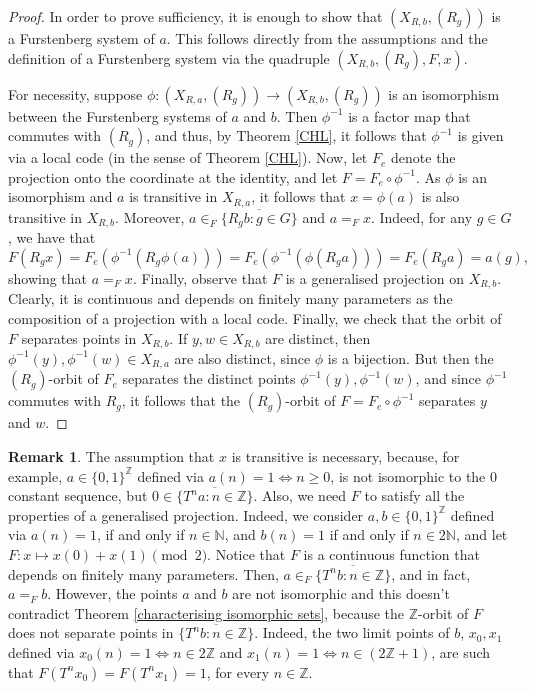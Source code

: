 \documentclass{amsart}
\numberwithin{equation}{section}
\theoremstyle{definition}
\newtheorem*{remark*}{Remark}
\theoremstyle{plain}
\newcommand{\N}{{\mathbb N}}
\newcommand{\Z}{{\mathbb Z}}
\begin{document}
\begin{proof}
In order to prove sufficiency, it is enough to show that 
$(X_{R,b},(R_g))$ is a Furstenberg system of $a$. This follows 
directly from the assumptions and the definition of a Furstenberg 
system via the quadruple $(X_{R,b},(R_g), F,x)$.

For necessity, suppose $\phi: (X_{R,a},(R_g)) \to (X_{R,b},(R_g))$ is 
an isomorphism between the Furstenberg systems of $a$ and $b$. Then $\phi^{-1}$ is 
a factor map that commutes with $(R_g)$, and thus, by Theorem \ref{CHL}, it follows that $\phi^{-1}$ is given 
via a local code (in the sense of Theorem \ref{CHL}). Now, let $F_e$ denote the projection onto the coordinate at the identity, and let $F=F_e\circ \phi^{-1}$. As $\phi$ is an isomorphism and $a$ is transitive in $X_{R,a}$, it follows that $x=\phi(a)$ is also transitive in $X_{R,b}$. Moreover, $a\in_F \overline{\{R_gb:g\in G\}}$ and $a=_F x$. Indeed, for any $g\in G$, we have that 
$$F(R_gx)=F_e(\phi^{-1} (R_g\phi(a)))=F_e(\phi^{-1} (\phi(R_ga)))=F_e(R_ga)=a(g),$$
showing that $a=_{F}x$. Finally, observe that $F$ is a generalised 
projection on $X_{R,b}$. Clearly, it is continuous and depends on finitely many parameters as the composition of a projection with a local code. Finally, we check that the orbit of $F$ separates points in $X_{R,b}$. If $y,w\in X_{R,b}$ are distinct, then $\phi^{-1}(y),\phi^{-1}(w)\in X_{R,a}$ are also distinct, since $\phi$ is a bijection. But then the $(R_g)$-orbit of $F_e$ separates the distinct points $\phi^{-1}(y),\phi^{-1}(w)$, and since $\phi^{-1}$ commutes with $R_g$, it follows that the $(R_g)$-orbit of $F=F_e\circ \phi^{-1}$ separates $y$ and $w$.
\end{proof}

\begin{remark*}
The assumption that $x$ is transitive is necessary, because, for 
example, $a\in \{0,1\}^{\Z}$ defined via $a(n)=1\iff n\geq 0$, is not isomorphic to the $0$ constant sequence, but $0\in \overline{\{T^na:n\in \Z\}}$. Also, we need $F$ to satisfy all the properties of a generalised projection. Indeed, we consider $a,b\in \{0,1\}^{\Z}$ defined via $a(n)=1$, if and only 
if $n\in \N$, and $b(n)=1$ if and only if $n\in 2\N$, and 
let $F:x\mapsto x(0)+x(1)\pmod{2}$. Notice that $F$ is a continuous function that depends on finitely many parameters. Then, $a\in_F \overline{\{T^nb:n\in \Z\}}$, 
and in fact, $a=_{F} b$. However, the points $a$ and $b$ 
are not 
isomorphic and this doesn't contradict Theorem \ref{characterising isomorphic sets}, because the $\Z$-orbit of $F$ does not separate points in $\overline{\{T^nb:n\in \Z\}}$. Indeed, the two limit points of $b$, $x_0,x_1$ defined via $x_0(n)=1 \iff n\in 2\Z$ and $x_1(n)=1 \iff n\in (2\Z+1)$, are such that $F(T^nx_0)=F(T^nx_1)=1$, for every $n\in \Z$.
\end{remark*}
\end{document}
